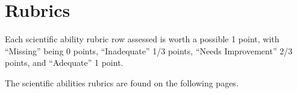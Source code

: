 
\chapter{Rubrics}\label{cha:rubrics}


Each scientific ability rubric row assessed is worth a possible 1 point, with ``Missing'' being 0 points, ``Inadequate'' 1/3 points, ``Needs Improvement'' 2/3 points, and ``Adequate'' 1 point.

The scientific abilities rubrics are found on the following pages.

